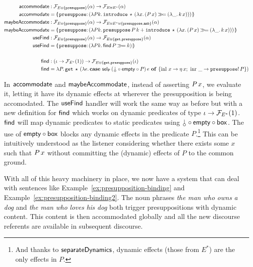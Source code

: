 \begin{align*}
  \accommodate &: \FF_{E \uplus \{\op{presuppose}\}}(\alpha) \to \FF_{E \uplus E^*}(\alpha) \\
  \accommodate &= \banana{\onto{\op{presuppose}}{(\lam{P k}{
    \app{\op{introduce}}{\star}{(\lam{x}{(\ap{P}{x}) \hsbind (\lam{\_}{\ap{k}{x}})})}})}} \\
  \maybeAccommodate &: \FF_{E \uplus \{\op{presuppose}\}}(\alpha) \to
                      \FF_{E \uplus E^* \uplus \{\op{presuppose},\op{amb}\}}(\alpha) \\
  \maybeAccommodate &= \banana{\onto{\op{presuppose}}{(\lam{P k}{
    \app{\op{presuppose}}{P}{k} +
    \app{\op{introduce}}{\star}{(\lam{x}{(\ap{P}{x}) \hsbind (\lam{\_}{\ap{k}{x}})})}})}} \\
  \useFind &: \FF_{E \uplus \{\op{presuppose}\}}(\alpha) \to \FF_{E \uplus \{\op{get}, \op{presuppose}\}}(\alpha) \\
  \useFind &= \banana{\onto{\op{presuppose}}{(\lam{P k}{\ap{\find}{P} \hsbind k})}} \\
  \\
  \find &: (\iota \to \FF_{E^*}(1)) \to \FF_{E \uplus \{\op{get}, \op{presuppose}\}}(\iota) \\
  \find &=
          \lam{P}{\app{\op{get}}{\star}{(\lam{e}{\case{\app{\selP}{(\cherry \circ \EMPTY \circ \box \circ P)}{e}}{x}{\etaE{x}}{\_}{\ap{\op{presuppose}!}{P}}})}}
\end{align*}

In $\mathsf{accommodate}$ and $\mathsf{maybeAccommodate}$, instead of asserting
$P\,x$, we evaluate it, letting it have its dynamic effects at
wherever the presupposition is being accomodated. The $\mathsf{useFind}$ handler
will work the same way as before but with a new definition for $\mathsf{find}$
which works on dynamic predicates of type $\iota \to \mathcal{F}_{E^*}(1)$. $\mathsf{find}$
will map dynamic predicates to static predicates using
$\cherry \circ \EMPTY \circ \BOX$. The use of $\mathsf{empty} \circ \mathsf{box}$ blocks
any dynamic effects in the predicate $P$.\footnote{And thanks to
  $\mathsf{separateDynamics}$, dynamic effects (those from $E^*$) are the only effects in
  $P$.} This can be intuitively understood as the listener considering
whether there exists some $x$ such that $P\,x$ without committing the
(dynamic) effects of $P$ to the common ground.

With all of this heavy machinery in place, we now have a system that can
deal with sentences like Example~\ref{ex:presupposition-binding} and
Example~\ref{ex:presupposition-binding2}. The noun phrases \emph{the man
  who owns a dog} and \emph{the man who loves his dog} both trigger
presuppositions with dynamic content. This content is then accommodated
globally and all the new discourse referents are available in subsequent
discourse.

